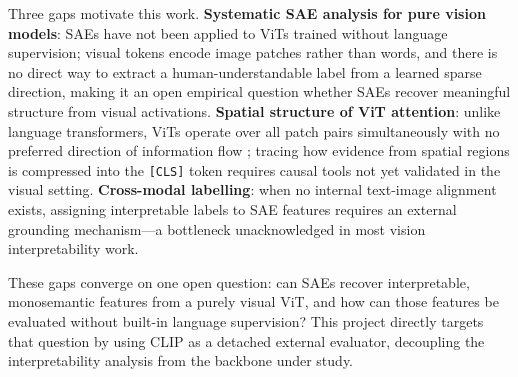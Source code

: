 Three gaps motivate this work. \textbf{Systematic SAE analysis for pure vision models}: SAEs have not been applied to ViTs trained without language supervision; visual tokens encode image patches rather than words, and there is no direct way to extract a human-understandable label from a learned sparse direction, making it an open empirical question whether SAEs recover meaningful structure from visual activations. \textbf{Spatial structure of ViT attention}: unlike language transformers, ViTs operate over all patch pairs simultaneously with no preferred direction of information flow \cite{Raghu2021}; tracing how evidence from spatial regions is compressed into the \texttt{[CLS]} token requires causal tools not yet validated in the visual setting. \textbf{Cross-modal labelling}: when no internal text-image alignment exists, assigning interpretable labels to SAE features requires an external grounding mechanism---a bottleneck unacknowledged in most vision interpretability work.

These gaps converge on one open question: can SAEs recover interpretable, monosemantic features from a purely visual ViT, and how can those features be evaluated without built-in language supervision? This project directly targets that question by using CLIP \cite{Radford2021} as a detached external evaluator, decoupling the interpretability analysis from the backbone under study.
